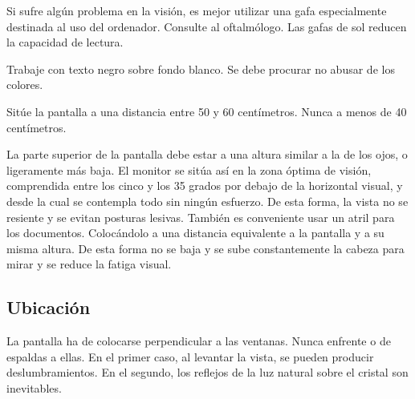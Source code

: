 Si sufre algún problema en la visión, es mejor utilizar una gafa especialmente destinada al uso del ordenador. Consulte al oftalmólogo. Las gafas de sol reducen la capacidad de lectura.

Trabaje con texto negro sobre fondo blanco. Se debe procurar no abusar de los colores.

Sitúe la pantalla a una distancia entre 50 y 60 centímetros. Nunca a menos de 40 centímetros.

La parte superior de la pantalla debe estar a una altura similar a la de los ojos, o ligeramente más baja. El monitor se sitúa así en la zona óptima de visión, comprendida entre los cinco y los 35 grados por debajo de la horizontal visual, y desde la cual se contempla todo sin ningún esfuerzo. De esta forma, la vista no se resiente y se evitan posturas lesivas.
También es conveniente usar un atril para los documentos. Colocándolo a una distancia equivalente a la pantalla y a su misma altura. De esta forma no se baja y se sube constantemente la cabeza para mirar y se reduce la fatiga visual.

\subsection{Ubicación}
La pantalla ha de colocarse perpendicular a las ventanas. Nunca enfrente o de espaldas a ellas. En el primer caso, al levantar la vista, se pueden producir deslumbramientos. En el segundo, los reflejos de la luz natural sobre el cristal son inevitables.
